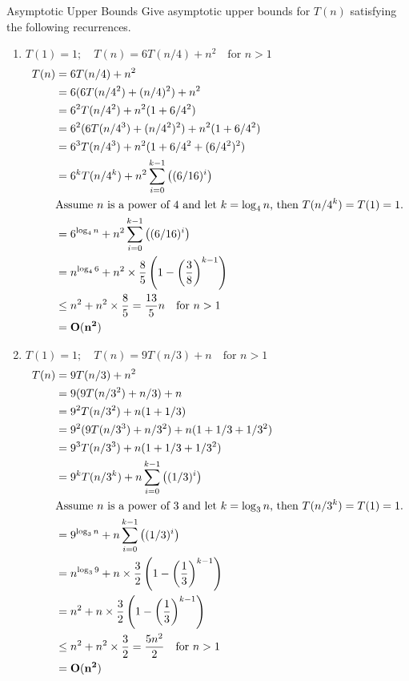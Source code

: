 \documentclass{article}
\begin{document}
\newpage
\begin{section}{Asymptotic Upper Bounds}
Give asymptotic upper bounds for $T(n)$ satisfying the following recurrences.

\begin{enumerate}
    \item $T(1) = 1; \quad T(n) = 6T(n/4) + n^2 \quad \text{for $n > 1$} $
    \begin{align*}
        T(n) &= 6T(n/4) + n^2 \\
        &= 6(6T(n/4^2) + (n/4)^2) + n^2 \\
        &= 6^2 T(n/4^2) + n^2 (1 + 6/4^2) \\
        &= 6^2 (6T(n/4^3) + (n/4^2)^2) + n^2 (1 + 6/4^2) \\
        &= 6^3 T(n/4^3) + n^2 (1 + 6/4^2 + (6/4^2) ^2) \\
        &= 6^k T(n/4^k) + n^2 \sum_{i = 0}^{k-1}\left((6/16)^i\right) \\
        & \text{Assume $n$ is a power of 4 and let $k = \log_4 n$, then $T(n/4^k) = T(1) = 1$.} \\
        &= 6^{\log_4 n} + n^2 \sum_{i = 0}^{k-1}\left((6/16)^i\right) \\
        &= n^{\log_4 6} + n^2 \times \frac{8}{5}\left(1 - \left(\frac{3}{8}\right)^{k-1}\right) \\ 
        &\leq n^2 + n^2 \times \frac{8}{5} = \frac{13}{5}n \quad \text{for $n > 1$} \\
        &= \mathbf{O(n^2)}
    \end{align*}

    \item $T(1) = 1; \quad T(n) = 9T(n/3) + n \quad \text{for $n > 1$}$
    \begin{align*}
        T(n) &= 9T(n/3) + n^2 \\
        &= 9(9T(n/3^2) + n/3) + n \\
        &= 9^2 T(n/3^2) + n (1 + 1/3) \\
        &= 9^2 (9T(n/3^3) + n/3^2) + n (1 + 1/3 + 1/3^2) \\
        &= 9^3 T(n/3^3) + n (1 + 1/3 + 1/3^2) \\
        &= 9^k T(n/3^k) + n \sum_{i = 0}^{k-1}\left((1/3)^i\right) \\
        & \text{Assume $n$ is a power of 3 and let $k = \log_3 n$, then $T(n/3^k) = T(1) = 1$.} \\
        &= 9^{\log_3 n} + n \sum_{i = 0}^{k-1}\left((1/3)^i\right) \\
        &= n^{\log_3 9} + n \times \frac{3}{2}\left(1 - \left(\frac{1}{3}\right)^{k-1}\right) \\ 
        &= n^2 + n \times \frac{3}{2}\left(1 - \left(\frac{1}{3}\right)^{k-1}\right) \\ 
        &\leq n^2 + n^2 \times \frac{3}{2} = \frac{5n^2}{2} \quad \text{for $n > 1$} \\
        &= \mathbf{O(n^2)}
    \end{align*}
\end{enumerate}
\end{section}
\end{document}
